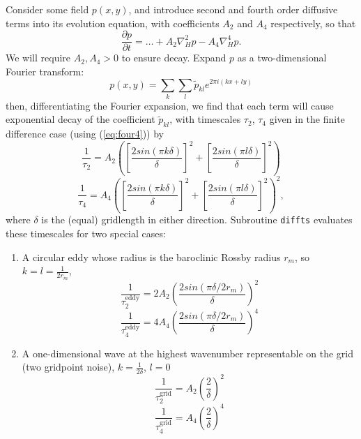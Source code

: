 \documentclass[11pt, a4paper,twoside]{article}
\newcommand{\rdm}[0]{{r_m}}
\newcommand{\pd}[2]{\frac{\partial #1}{\partial #2}}
\numberwithin{equation}{section}
\begin{document}
Consider some field $p(x,y)$, and introduce second and fourth order diffusive terms into its evolution equation, with coefficients $A_2$ and $A_4$ respectively, so that
\begin{equation}
\pd{p}{t} = \ldots + A_2\nabla_H^2 p - A_4\nabla_H^4p.
\end{equation}
We will require $A_2 , A_4 > 0$  to ensure decay.
Expand $p$ as a two-dimensional Fourier transform:
\begin{equation}
p(x,y) = \sum_k \sum_l \tilde{p}_{kl} e^{ 2 \pi i( kx + ly )}
\end{equation}
then, differentiating the Fourier expansion, we find that each term will cause exponential decay of the coefficient $\tilde{p}_{kl}$, with timescales $\tau_2$, $\tau_4$ given in the finite difference case (using (\ref{eq:four4})) by
\begin{equation}
\frac{1}{\tau_2} =  A_2 \left(  \left[\frac{2 sin(\pi k \delta)}{\delta}\right]^2 + \left[\frac{2 sin(\pi l \delta)}{\delta}\right]^2 \right)
\end{equation}
\begin{equation}
\frac{1}{\tau_4} =  A_4 \left(  \left[\frac{2 sin(\pi k \delta)}{\delta}\right]^2 + \left[ \frac{2 sin(\pi l \delta)}{\delta}\right]^2 \right)^2,
\end{equation}
where $\delta$ is the (equal) gridlength in either direction.
Subroutine \verb=diffts= evaluates these timescales for two special cases:
\begin{enumerate}
\item A circular eddy whose radius is the baroclinic Rossby radius $\rdm$, so $k = l = \frac{1}{2\rdm}$,
\begin{equation}
\frac{1}{\tau^{\textrm{eddy}}_2} =  2 A_2 \left( \frac{2 sin(\pi \delta/2\rdm)}{\delta}\right)^2
\end{equation}
\begin{equation}
\frac{1}{\tau^{\textrm{eddy}}_4} =  4 A_4 \left( \frac{2 sin(\pi \delta/2\rdm)}{\delta}\right)^4
\end{equation}
\item A one-dimensional wave at the highest wavenumber representable on the grid (two gridpoint noise), $k = \frac{1}{2\delta}$, $l = 0$
\begin{equation}
\frac{1}{\tau^{\textrm{grid}}_2} =  A_2 \left( \frac{ 2}{\delta} \right)^2
\end{equation}
\begin{equation}
\frac{1}{\tau^{\textrm{grid}}_4} =  A_4 \left( \frac{ 2}{\delta} \right)^4
\end{equation}
\end{enumerate}
\end{document}
